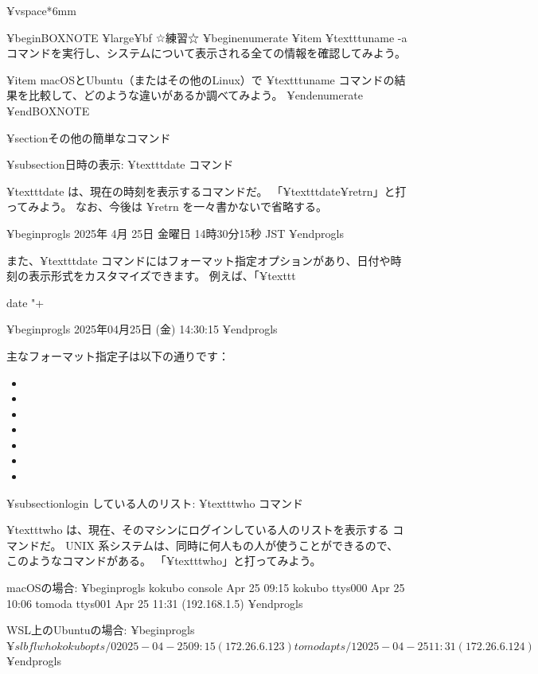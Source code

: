 {¥vspace*{6mm}

¥begin{BOXNOTE}
{¥large¥bf ☆練習☆}
¥begin{enumerate}
¥item ¥texttt{uname -a} コマンドを実行し、システムについて表示される全ての情報を確認してみよう。

¥item macOSとUbuntu（またはその他のLinux）で ¥texttt{uname} コマンドの結果を比較して、どのような違いがあるか調べてみよう。
¥end{enumerate}
¥end{BOXNOTE}

¥section{その他の簡単なコマンド}

¥subsection{日時の表示: ¥texttt{date} コマンド}

 ¥texttt{date} は、現在の時刻を表示するコマンドだ。
「¥texttt{date}¥retrn」と打ってみよう。
なお、今後は ¥retrn を一々書かないで省略する。

¥begin{progls}
2025年 4月 25日 金曜日 14時30分15秒 JST
% 
¥end{progls}

また、¥texttt{date} コマンドにはフォーマット指定オプションがあり、日付や時刻の表示形式をカスタマイズできます。
例えば、「¥texttt{date "+%

¥begin{progls}
2025年04月25日 (金) 14:30:15
% 
¥end{progls}

主なフォーマット指定子は以下の通りです：
\begin{itemize}
\item %
\item %
\item %
\item %
\item %
\item %
\item %
\end{itemize}


¥subsection{login している人のリスト: ¥texttt{who} コマンド}

 ¥texttt{who} は、現在、そのマシンにログインしている人のリストを表示する
コマンドだ。
 UNIX 系システムは、同時に何人もの人が使うことができるので、
このようなコマンドがある。
「¥texttt{who}」と打ってみよう。

macOSの場合:
¥begin{progls}
kokubo   console  Apr 25 09:15 
kokubo   ttys000  Apr 25 10:06
tomoda   ttys001  Apr 25 11:31   (192.168.1.5)
% 
¥end{progls}

WSL上のUbuntuの場合:
¥begin{progls}
$ ¥slbfl{who}
kokubo   pts/0        2025-04-25 09:15 (172.26.6.123)
tomoda   pts/1        2025-04-25 11:31 (172.26.6.124)
$ 
¥end{progls}

}}
